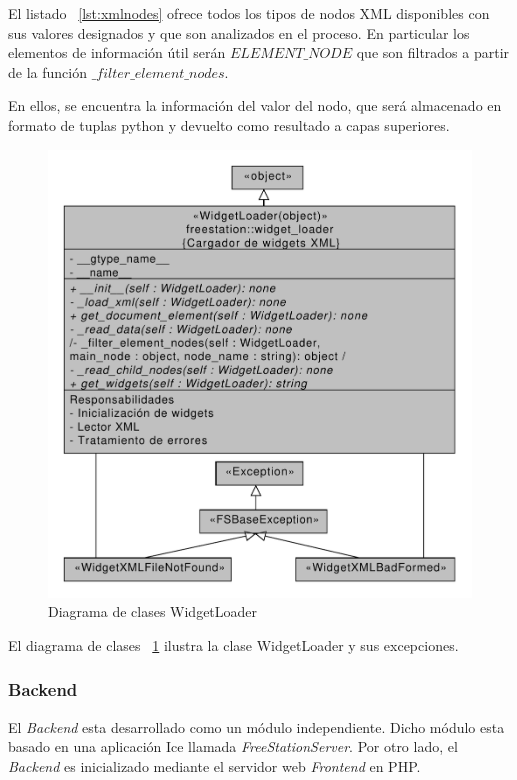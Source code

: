 \newpage

El listado ~\ref{lst:xmlnodes} ofrece todos los tipos de nodos XML disponibles
con sus valores designados y que son analizados en el proceso. En particular los 
elementos de información útil serán $ELEMENT\_NODE$ que son filtrados
a partir de la función $\_filter\_element\_nodes$. 

En ellos, se encuentra la información del valor del nodo, que será almacenado en
formato de tuplas python y devuelto como resultado a capas superiores.

\begin{figure}[ht]
    \begin{center}
        \includegraphics[width=425px]{src/img/diagrams/freestation-class-diagram-widgetloader.pdf}
        \caption[Diagrama de clases FreeStationApp y GUI]
          {Diagrama de clases WidgetLoader}
        \label{fig:widgetloader}
    \end{center}
\end{figure}

El diagrama de clases ~\ref{fig:widgetloader} ilustra la clase WidgetLoader y
sus excepciones.

\newpage

\subsubsection{Backend}
\label{sec:backendice}

El \emph{Backend} esta desarrollado como un módulo independiente. Dicho módulo
esta basado en una aplicación Ice llamada \emph{FreeStationServer}. Por otro lado, el
\emph{Backend} es inicializado mediante el servidor web \emph{Frontend}
en PHP.

